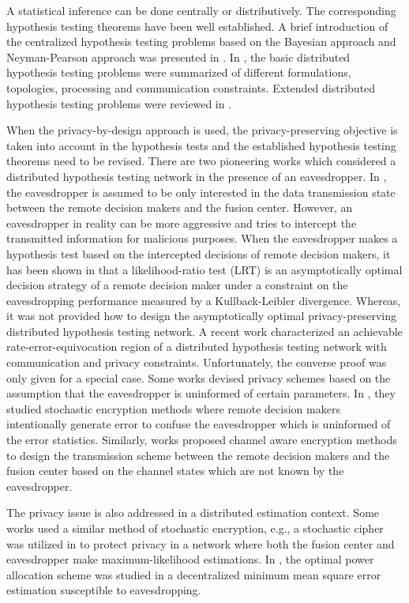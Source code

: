 A statistical inference can be done centrally or distributively. The corresponding hypothesis testing theorems have been well established. A brief introduction of the centralized hypothesis testing problems based on the Bayesian approach and Neyman-Pearson approach was presented in \cite{trees2001}. In \cite{varshney1996,tsitsiklis1993}, the basic distributed hypothesis testing problems were summarized of different formulations, topologies, processing and communication constraints. Extended distributed hypothesis testing problems were reviewed in \cite{blum1997}.

When the privacy-by-design approach is used, the privacy-preserving objective is taken into account in the hypothesis tests and the established hypothesis testing theorems need to be revised. There are two pioneering works \cite{marano2009,nadendla2010} which considered a distributed hypothesis testing network in the presence of an eavesdropper. In \cite{marano2009}, the eavesdropper is assumed to be only interested in the data transmission state between the remote decision makers and the fusion center. However, an eavesdropper in reality can be more aggressive and tries to intercept the transmitted information for malicious purposes. When the eavesdropper makes a hypothesis test based on the intercepted decisions of remote decision makers, it has been shown in \cite{nadendla2010} that a likelihood-ratio test (LRT) is an asymptotically optimal decision strategy of a remote decision maker under a constraint on the eavesdropping performance measured by a Kullback-Leibler divergence. Whereas, it was not provided how to design the asymptotically optimal privacy-preserving distributed hypothesis testing network. A recent work \cite{mhanna2015} characterized an achievable rate-error-equivocation region of a distributed hypothesis testing network with communication and privacy constraints. Unfortunately, the converse proof was only given for a special case. Some works devised privacy schemes based on the assumption that the eavesdropper is uninformed of certain parameters. In \cite{nadendla2009,soosahabi2014}, they studied stochastic encryption methods where remote decision makers intentionally generate error to confuse the eavesdropper which is uninformed of the error statistics. Similarly, works \cite{jeon2011,jeon2013} proposed channel aware encryption methods to design the transmission scheme between the remote decision makers and the fusion center based on the channel states which are not known by the eavesdropper.

The privacy issue is also addressed in a distributed estimation context. Some works used a similar method of stochastic encryption, e.g., a stochastic cipher was utilized in \cite{aysal2008} to protect privacy in a network where both the fusion center and eavesdropper make maximum-likelihood estimations. In \cite{guo2017}, the optimal power allocation scheme was studied in a decentralized minimum mean square error estimation susceptible to eavesdropping.

